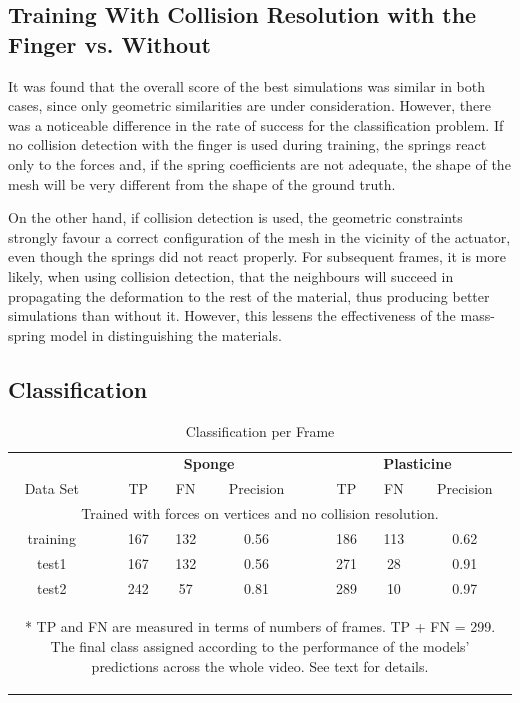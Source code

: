 \documentclass[journal]{IEEEtran}
\begin{document}
\subsection{Training With Collision Resolution with the Finger vs. Without}
It was found that the overall score of the best simulations was similar in both cases, since only geometric similarities are under consideration.  However, there was a noticeable difference in the rate of success for the classification problem.  If no collision detection with the finger is used during training, the springs react only to the forces and, if the spring coefficients are not adequate, the shape of the mesh will be very different from the shape of the ground truth.

On the other hand, if collision detection is used, the geometric constraints strongly favour a correct configuration of the mesh in the vicinity of the actuator, even though the springs did not react properly.  For subsequent frames, it is more likely, when using collision detection, that the neighbours will succeed in propagating the deformation to the rest of the material, thus producing better simulations than without it.  However, this lessens the effectiveness of the mass-spring model in distinguishing the materials.

\subsection{Classification}

\begin{table}[!t]
\renewcommand{\arraystretch}{1.3}
\caption{Classification per Frame}
\label{tab:classperframe}
\centering
\begin{tabular}{ccccccccc}
\hline
 & & \multicolumn{3}{c}{\bfseries Sponge} & & \multicolumn{3}{c}{\bfseries Plasticine} \\
Data Set & & TP & FN & Precision & & TP & FN & Precision\\
\hline\hline
 \multicolumn{9}{c}{Trained with forces on vertices and no collision resolution.} \\
\hline
   training & & 167 & 132 & 0.56 & & 186 & 113 & 0.62 \\
   test1 & & 167 & 132 & 0.56 & & 271 & 28 & 0.91 \\
   test2 & & 242 & 57 & 0.81 & & 289 & 10 & 0.97 \\ 
\hline
\multicolumn{9}{p{0.9\columnwidth}}{\begin{footnotesize}* TP and FN are measured in terms of numbers of frames. TP + FN = 299.  The final class assigned according to the performance of the models' predictions across the whole video. See text for details. \end{footnotesize}}
\end{tabular}
\end{table}
\end{document}
